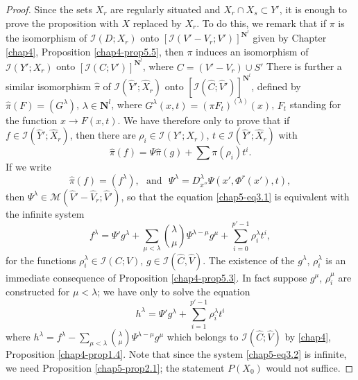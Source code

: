 \begin{proof}
  Since the sets $X_r$ are regularly situated and $X_r \cap X_s \subset Y'$, it is enough to prove the proposition with $X$ replaced by $X_r$. To do this, we remark that if $\pi$ is the isomorphism of $\mathscr{I}(D; X_r)$ onto $[\mathscr{I}(V' - V_r ; V')]^{\mathbf{N}^l}$ given by Chapter \ref{chap4}, Proposition \ref{chap4-prop5.5}, then $\pi$ induces an isomorphism of $\mathscr{I}(Y';X_r)$ onto $[\mathscr{I}(C; V')]^{\mathbf{N}^l}$, where $C = (V' - V_r) \cup S'$ There is further a similar isomorphism $\widehat{\pi}$ of $\mathscr{I}(\widehat{Y}' ; \widehat{X}_r)$ onto $[\mathscr{I} (\widehat{C};\widehat{V}')]^{\mathbf{N}^l}$, defined by $\widehat{\pi}(F) = (G^{\lambda})$, $\lambda \in \mathbf{N}^l$, where $G^\lambda (x,t) = (\pi F_t)^{(\lambda)}(x)$, $F_t$ standing for the function $x \to F (x,t)$. We have therefore only to prove that if $f \in \mathscr{I}(\widehat{Y}'; \widehat{X}_r)$, then there are $\rho_i \in \mathscr{I}(Y';X_r)$, $t \in \mathscr{I}(\widehat{Y}'; \widehat{X}_r)$ with
  \begin{equation*}
    \widehat{\pi} (f) = \Psi \widehat{\pi} (g) + \sum \pi (\rho_i) t^i. \tag{3.1}\label{chap5-eq3.1}
  \end{equation*}
\pageoriginale
  If we write
  $$
\widehat{\pi} (f) = (f^\lambda), \text{~ and ~} \Psi^\lambda = D^\lambda_{x''} \Psi (x', \Phi^r (x'), t),
$$
then $\Psi^{\lambda} \in \mathscr{M} (\widehat{V}' - \widehat{V}_r; \widehat{V}')$, so that the equation \eqref{chap5-eq3.1} is equivalent with the infinite system
\begin{equation*}
  f^\lambda = \Psi' g^{\lambda} + \sum\limits_{\mu < \lambda}  \binom{\lambda}{\mu} \Psi^{\lambda - \mu} g^{\mu} + \sum\limits^{p'-1}_{i=0} \rho^{\lambda}_i t^i, \tag{3.2}\label{chap5-eq3.2}
\end{equation*}
for the functions $\rho^{\lambda}_i \in \mathscr{I} (C; V)$, $g \in \mathscr{I} (\widehat{C}, \widehat{V})$. The existence of the $g^{\lambda}$, $\rho^{\lambda}_i$ is an immediate consequence of Proposition \ref{chap4-prop5.3}. In fact suppose $g^{\mu}$, $\rho^{\mu}_i$ are constructed for $\mu < \lambda$; we have only to solve the equation
$$
h^{\lambda} = \Psi' g^{\lambda} + \sum\limits^{p'-1}_{i=1} \rho^{\lambda}_i t^i
$$
where $h^{\lambda} = f^{\lambda} - \sum\limits_{\mu < \lambda} \binom{\lambda}{\mu} \Psi^{\lambda - \mu} g^{\mu}$ which belongs to $\mathscr{I} (\widehat{C}; \widehat{V})$ by \ref{chap4}, Proposition \ref{chap4-prop1.4}. Note that since the system \eqref{chap5-eq3.2} is infinite, we need Proposition \ref{chap5-prop2.1}; the statement $P(X_0)$ would not suffice.
\end{proof}

